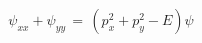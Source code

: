 \begin{equation}
\psi_{xx} + \psi_{yy} \, = \, \left( p^2_x + p^2_y - E \right) \psi
\label{eq:elliptic}
\end{equation}

